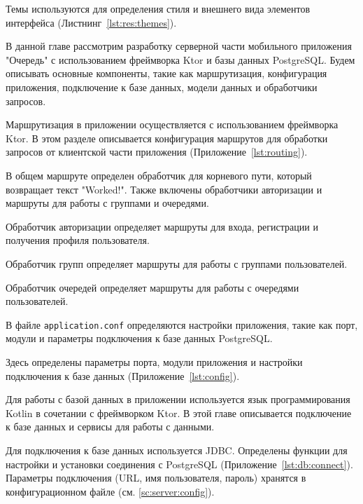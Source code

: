 Темы используются для определения стиля и внешнего вида элементов интерфейса
(Листнинг~\ref{lst:res:themes}).



В данной главе рассмотрим разработку серверной части мобильного приложения
"Очередь" с использованием фреймворка Ktor и базы данных PostgreSQL.
Будем описывать основные компоненты, такие как маршрутизация,
конфигурация приложения, подключение к базе данных,
модели данных и обработчики запросов.


Маршрутизация в приложении осуществляется с использованием фреймворка Ktor.
В этом разделе описывается конфигурация маршрутов
для обработки запросов от клиентской части приложения
(Приложение~\ref{lst:routing}).

В общем маршруте определен обработчик для корневого пути,
который возвращает текст "Worked!".
Также включены обработчики авторизации
и маршруты для работы с группами и очередями.

Обработчик авторизации определяет маршруты для входа,
регистрации и получения профиля пользователя.

Обработчик групп определяет маршруты для работы с группами пользователей.

Обработчик очередей определяет маршруты для работы с очередями пользователей.

\label{sc:server:config}

В файле \texttt{application.conf} определяются настройки приложения,
такие как порт, модули и параметры подключения к базе данных PostgreSQL.\par
Здесь определены параметры порта, модули приложения
и настройки подключения к базе данных (Приложение~\ref{lst:config}).


Для работы с базой данных в приложении используется язык программирования Kotlin в сочетании с фреймворком Ktor. В этой главе описывается подключение к базе данных и сервисы для работы с данными.

Для подключения к базе данных используется JDBC.
Определены функции для настройки и установки соединения с PostgreSQL
(Приложение~\ref{lst:db:connect}).
Параметры подключения (URL, имя пользователя, пароль)
хранятся в конфигурационном файле (см. \ref{sc:server:config}).\par

